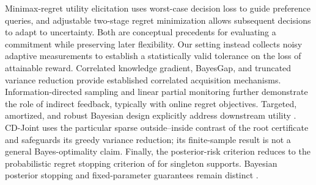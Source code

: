 \documentclass{article}
\theoremstyle{plain}
\theoremstyle{definition}
\begin{document}
Minimax-regret utility elicitation \citep{boutilier2006minimax} uses worst-case decision loss to guide preference queries, and adjustable two-stage regret minimization \citep{poursoltani2022regret} allows subsequent decisions to adapt to uncertainty. Both are conceptual precedents for evaluating a commitment while preserving later flexibility. Our setting instead collects noisy adaptive measurements to establish a statistically valid tolerance on the loss of attainable reward. Correlated knowledge gradient, BayesGap, and truncated variance reduction \citep{frazier2009kg,xie2016correlated,hoffman2014bayesgap,bogunovic2016truvar} provide established correlated acquisition mechanisms. Information-directed sampling and linear partial monitoring \citep{russo2018ids,kirschner2020ids} further demonstrate the role of indirect feedback, typically with online regret objectives. Targeted, amortized, and robust Bayesian design explicitly address downstream utility \citep{chaloner1995design,filstroff2024targeted,huang2024amortized,go2026goal}. CD-Joint uses the particular sparse outside--inside contrast of the root certificate and safeguards its greedy variance reduction; its finite-sample result is not a general Bayes-optimality claim. Finally, the posterior-risk criterion reduces to the probabilistic regret stopping criterion of \citet{wilson2024stopping} for singleton supports. Bayesian posterior stopping and fixed-parameter guarantees remain distinct \citep{shang2020bayesian,jang2024bayesian}.
\end{document}
